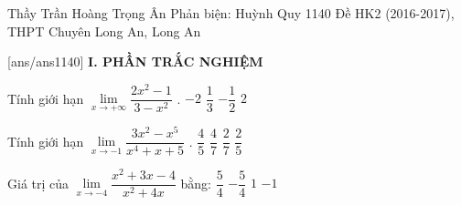 \begin{name}
{Thầy Trần Hoàng Trọng Ân
\newline Phản biện: Huỳnh Quy}
{1140 Đề HK2 (2016-2017), THPT Chuyên Long An, Long An}
\end{name}
\setcounter{ex}{0}\setcounter{bt}{0}
[ans/ans1140]
\noindent\textbf{I. PHẦN TRẮC NGHIỆM}
\begin{ex}	 
Tính giới hạn $\lim\limits_{x\to +\infty}\dfrac{2x^2 - 1}{3 - x^2}$ .
\choice
{\True $ - 2$}
{ $\dfrac{1}{3}$}
{$ - \dfrac{1}{2}$}
{$2$}

\end{ex}

\begin{ex}	 %
Tính giới hạn $\lim\limits_{x\to -1}\dfrac{3x^2  -  x^5}{x^4  +  x  +  5}$ .
 \choice
{\True $\dfrac{4}{5}$}
{$\dfrac{4}{7}$}
{$\dfrac{2}{7}$}
{$\dfrac{2}{5}$}
\end{ex}

\begin{ex}	
Giá trị của $\lim\limits_{x\to -4}\dfrac{x^2  +  3x  -  4}{x^2  +  4x}$ bằng:
 \choice
{\True $\dfrac{5}{4}$}
{$  -  \dfrac{5}{4}$}
{ $1$}
{$  -  1$}
\end{ex}

